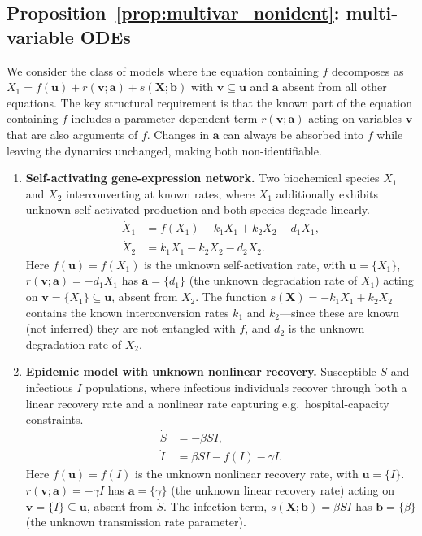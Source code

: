 \documentclass{article}
\theoremstyle{plain}
\theoremstyle{definition}
\renewcommand{\vec}[1]{\boldsymbol{#1}}
\begin{document}
{\subsection{Proposition~\ref{prop:multivar_nonident}: multi-variable ODEs} \label{appendix:examples_multivar}

 We consider the class of models where the equation containing $f$ decomposes as $\dot{X}_1 = f(\vec{u}) + r(\vec{v};\vec{a}) + s(\vec{X};\vec{b})$ with $\vec{v} \subseteq \vec{u}$ and $\vec{a}$ absent from all other equations. The key structural requirement is that the known part of the equation containing $f$ includes a parameter-dependent term $r(\vec{v};\vec{a})$ acting on variables $\vec{v}$ that are also arguments of $f$. Changes in $\vec{a}$ can always be absorbed into $f$ while leaving the dynamics unchanged, making both non-identifiable.

\begin{enumerate}

    \item \textbf{Self-activating gene-expression network.} Two biochemical species $X_1$ and $X_2$ interconverting at known rates, where $X_1$ additionally exhibits unknown self-activated production and both species degrade linearly.
    \begin{align*}
        \dot{X}_1 &= f(X_1) - k_1 X_1 + k_2 X_2 - d_1 X_1, \\
        \dot{X}_2 &= k_1 X_1 - k_2 X_2 - d_2 X_2.
    \end{align*}
    Here $f(\vec{u}) = f(X_1)$ is the unknown self-activation rate, with $\vec{u} = \{X_1\}$, $r(\vec{v};\vec{a}) = -d_1 X_1$ has $\vec{a} = \{d_1\}$ (the unknown degradation rate of $X_1$) acting on $\vec{v} = \{X_1\} \subseteq \vec{u}$, absent from $\dot{X}_2$. The function $s(\vec{X}) = -k_1 X_1 + k_2 X_2$ contains the known interconversion rates $k_1$ and $k_2$---since these are known (not inferred) they are not entangled with $f$, and $d_2$ is the unknown degradation rate of $X_2$.

    \item \textbf{Epidemic model with unknown nonlinear recovery.} Susceptible $S$ and infectious $I$ populations, where infectious individuals recover through both a linear recovery rate and a nonlinear rate capturing e.g.\ hospital-capacity constraints.
    \begin{align*}
        \dot{S} &= -\beta SI, \\
        \dot{I} &= \beta SI - f(I) - \gamma I.
    \end{align*}
    Here $f(\vec{u}) = f(I)$ is the unknown nonlinear recovery rate, with $\vec{u} = \{I\}$. $r(\vec{v};\vec{a}) = -\gamma I$ has $\vec{a} = \{\gamma\}$ (the unknown linear recovery rate) acting on $\vec{v} = \{I\} \subseteq \vec{u}$, absent from $\dot{S}$. The infection term, $s(\vec{X};\vec{b}) = \beta SI$ has $\vec{b} = \{\beta\}$ (the unknown transmission rate parameter).


\end{enumerate}}
\end{document}
